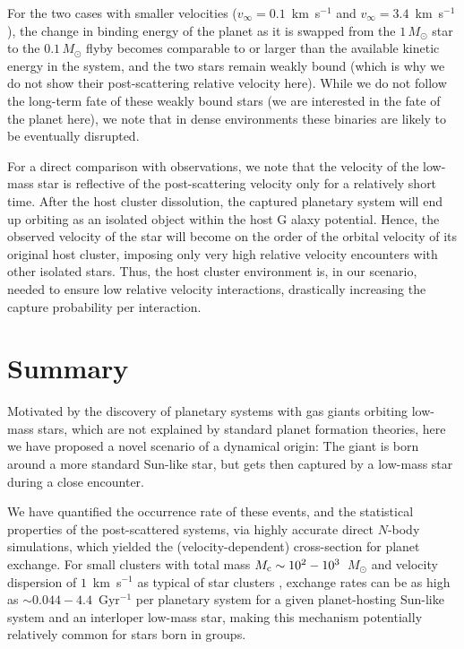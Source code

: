 \documentclass[twocolumn]{aastex62}
\begin{document}
For the two cases with smaller velocities  
($v_\infty=0.1$~km~s$^{-1}$ and $v_\infty=3.4$~km~s$^{-1}$), the change in binding energy of the planet as it is swapped from the $1\,M_\odot$ star to the $0.1\,M_\odot$ flyby becomes
comparable to or larger than the available kinetic energy in the system, and the two stars remain weakly bound (which is why we do not show their post-scattering relative velocity here). While we do not follow the long-term fate of these weakly bound stars (we are interested in the fate of the planet here), we note that in dense environments these binaries are likely to be eventually disrupted.

For a direct comparison with observations, we note that the velocity of the low-mass star is reflective of the post-scattering
velocity only for a relatively short time. After the host cluster dissolution, the captured planetary system will end up orbiting as an isolated object within the host G
alaxy potential.  Hence, the observed velocity of the star will become on the order of the orbital velocity of its original host cluster, imposing only very high relative velocity encounters with other isolated stars.  Thus, the host cluster environment is, in our scenario, needed to ensure low relative velocity interactions, drastically increasing the capture probability per interaction. 






\section{Summary}
Motivated by the discovery of planetary systems with gas giants orbiting low-mass stars, which are not explained 
by standard planet formation theories, here we have proposed a novel scenario of a dynamical origin:  The giant is born around a more standard Sun-like star, but gets then captured by a low-mass star during a close encounter. 

We have quantified the occurrence rate of these events, and the statistical properties of the post-scattered systems, via 
highly accurate direct $N$-body simulations, which yielded the (velocity-dependent) cross-section for planet exchange.
{\color{red}For small clusters with total mass $M_{\rm c}\sim10^2-10^3$~$M_\odot$ and
velocity dispersion of $1$~km~s$^{-1}$
as typical of star clusters \citep{Adams2001},
exchange rates can be as high as $\sim 0.044-4.4$~Gyr$^{-1}$ per planetary system}  for a given planet-hosting Sun-like system and an interloper low-mass star, making this mechanism potentially relatively common for stars born in groups.
\end{document}
